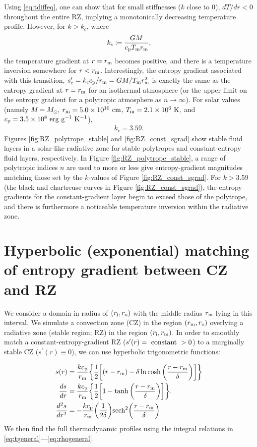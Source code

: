 \documentclass[12pt]{article} %
\newcommand{\rrm}{r_{\rm{m}}}
\newcommand{\ri}{r_{\rm{i}}}
\newcommand{\ro}{r_{\rm{o}}}
\newcommand{\cp}{c_{\rm{p}}}
\begin{document}
Using \eqref{eq:tdiffeq}, one can show that for small stiffnesses ($k$ close to $0$), $dT/dr < 0$ throughout the entire RZ, implying a monotonically decreasing temperature profile. However, for $k>k_c$, where
\begin{align}
k_c\coloneqq \frac{GM}{\cp T_{\rm{m}}\rrm},
\end{align}
the temperature gradient at $r=\rrm$ becomes positive, and there is a temperature inversion somewhere for $r<\rrm$. Interestingly, the entropy gradient associated with this transition, $s^\prime_c=k_c\cp/\rrm=GM/T_{\rm{m}}\rrm^2$ is exactly the same as the entropy gradient at $r=\rrm$ for an isothermal atmosphere (or the upper limit on the entropy gradient for a polytropic atmosphere as $n\rightarrow\infty$). For solar values (namely $M=M_\odot$, $\rrm = 5.0\times10^{10}\ \rm{cm}$, $T_{\rm{m}} = 2.1\times10^6\ \rm{K}$, and $\cp=3.5\times10^8\ \rm{erg\ g^{-1}\ K^{-1}}$),
\begin{align}
k_c = 3.59.
\label{eq:kc_solar}
\end{align}
Figures \ref{fig:RZ_polytrope_stable} and \ref{fig:RZ_const_sgrad} show stable fluid layers in a solar-like radiative zone for stable polytropes and constant-entropy fluid layers, respectively. In Figure \ref{fig:RZ_polytrope_stable}, a range of polytropic indices $n$ are used to more or less give entropy-gradient magnitudes matching those set by the $k$-values of Figure \ref{fig:RZ_const_sgrad}. For $k>3.59$ (the black and chartreuse curves in Figure \ref{fig:RZ_const_sgrad}), the entropy gradients for the constant-gradient layer begin to exceed those of the polytrope, and there is furthermore a noticeable temperature inversion within the radiative zone.

\section{Hyperbolic (exponential)  matching of entropy gradient between CZ and RZ}
We consider a domain in radius of $(\ri,\ro)$ with the middle radius $\rrm$ lying in this interval. We simulate a convection zone (CZ) in the region $(\rrm, \ro)$ overlying a radiative zone (stable region; RZ) in the region $(\ri,\rrm)$. In order to smoothly match a constant-entropy-gradient RZ ($s^\prime(r)=\ \rm{constant}\ > 0$) to a marginally stable CZ ($s^\prime(r)\equiv 0$), we can use hyperbolic trigonometric functions:

\begin{align}
s(r) &= \frac{k\cp}{\rrm}\bigg{\{}\frac{1}{2}{\bigg{[}(r-\rrm) -\delta\ln\cosh{\bigg{(}\frac{r-\rrm}{\delta}\bigg{)}\bigg{]}}\bigg{\}}}\label{eq:s_tanh_transition}\\
\frac{ds}{dr} &= \frac{k\cp}{\rrm}\bigg{\{}\frac{1}{2}\bigg{[}1 - \tanh{\bigg{(}\frac{r-\rrm}{\delta}\bigg{)}}\bigg{]}\bigg{\}}.\label{eq:dsdr_tanh_transition}\\
\frac{d^2s}{dr^2} &= -\frac{k\cp}{\rrm}\bigg{(}\frac{1}{2\delta}\bigg{)}{\rm{sech}}^2\bigg{(}\frac{r-\rrm}{\delta}\bigg{)}
\end{align}
We then find the full thermodynamic profiles using the integral relations in \eqref{eq:tgeneral}---\eqref{eq:rhogeneral}.
\end{document}
